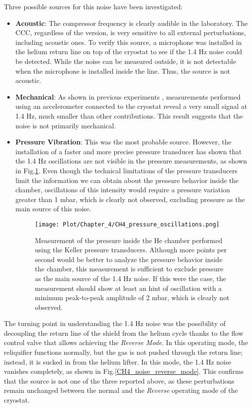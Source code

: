 \documentclass[12pt,a4paper]{report}
\begin{document}
        Three possible sources for this noise have been investigated:
        \begin{itemize}
        	\item \textbf{Acoustic}: The compressor frequency is clearly audible in the laboratory. The CCC, regardless of the version, is very sensitive to all external perturbations, including acoustic ones. To verify this source, a microphone was installed in the helium return line on top of the cryostat to see if the 1.4 Hz noise could be detected. While the noise can be measured outside, it is not detectable when the microphone is installed inside the line. Thus, the source is not acoustic.
        	\item \textbf{Mechanical}: As shown in previous experiments \cite{DavidThesis}, measurements performed using an accelerometer connected to the cryostat reveal a very small signal at 1.4 Hz, much smaller than other contributions. This result suggests that the noise is not primarily mechanical.
        	\item \textbf{Pressure Vibration}: This was the most probable source. However, the installation of a faster and more precise pressure transducer has shown that the 1.4 Hz oscillations are not visible in the pressure measurements, as shown in Fig.\ref{CH4_pressure_oscillations}. Even though the technical limitations of the pressure transducers limit the information we can obtain about the pressure behavior inside the chamber, oscillations of this intensity would require a pressure variation greater than 1 mbar, which is clearly not observed, excluding pressure as the main source of this noise.
        	\begin{figure}[H]
        		\centering
        		\texttt{[image: Plot/Chapter\_4/CH4\_pressure\_oscillations.png]}
        		\caption{\small{Measurement of the pressure inside the He chamber performed using the Keller pressure transducers. Although more points per second would be better to analyze the pressure behavior inside the chamber, this measurement is sufficient to exclude pressure as the main source of the 1.4 Hz noise. If this were the case, the measurement should show at least an hint of oscillation with a minimum peak-to-peak amplitude of 2 mbar, which is clearly not observed.}}
        		\label{CH4_pressure_oscillations}
        	\end{figure}
        \end{itemize}
        The turning point in understanding the 1.4 Hz noise was the possibility of decoupling the return line of the shield from the helium cycle thanks to the flow control valve that allows achieving the \textit{Reverse Mode}. In this operating mode, the reliquifier functions normally, but the gas is not pushed through the return line; instead, it is sucked in from the helium lifter. In this mode, the 1.4 Hz noise vanishes completely, as shown in Fig.\ref{CH4_noise_reverse_mode}. This confirms that the source is not one of the three reported above, as these perturbations remain unchanged between the normal and the \textit{Reverse} operating mode of the cryostat.
\end{document}
